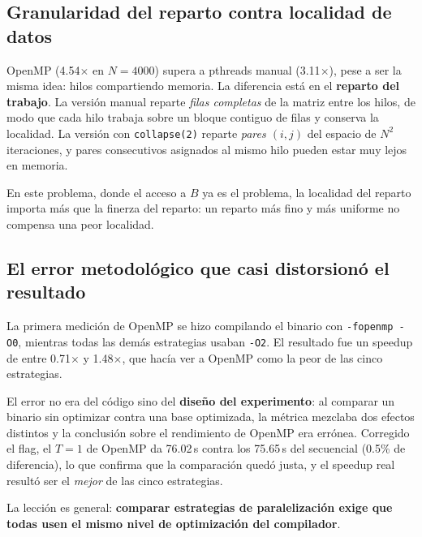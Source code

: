 \subsection{Granularidad del reparto contra localidad de datos}

OpenMP (4.54$\times$ en $N=4000$) supera a pthreads manual (3.11$\times$), pese a ser la misma idea: hilos compartiendo memoria. La diferencia está en el \textbf{reparto del trabajo}. La versión manual reparte \emph{filas completas} de la matriz entre los hilos, de modo que cada hilo trabaja sobre un bloque contiguo de filas y conserva la localidad. La versión con \texttt{collapse(2)} reparte \emph{pares $(i,j)$} del espacio de $N^2$ iteraciones, y pares consecutivos asignados al mismo hilo pueden estar muy lejos en memoria.

En este problema, donde el acceso a $B$ ya es el problema, la localidad del reparto importa más que la finerza del reparto: un reparto más fino y más uniforme no compensa una peor localidad.

\subsection{El error metodológico que casi distorsionó el resultado}

La primera medición de OpenMP se hizo compilando el binario con \texttt{-fopenmp -O0}, mientras todas las demás estrategias usaban \texttt{-O2}. El resultado fue un speedup de entre 0.71$\times$ y 1.48$\times$, que hacía ver a OpenMP como la peor de las cinco estrategias.

El error no era del código sino del \textbf{diseño del experimento}: al comparar un binario sin optimizar contra una base optimizada, la métrica mezclaba dos efectos distintos y la conclusión sobre el rendimiento de OpenMP era errónea. Corregido el flag, el $T=1$ de OpenMP da 76.02\,s contra los 75.65\,s del secuencial (0.5\% de diferencia), lo que confirma que la comparación quedó justa, y el speedup real resultó ser el \emph{mejor} de las cinco estrategias.

La lección es general: \textbf{comparar estrategias de paralelización exige que todas usen el mismo nivel de optimización del compilador}.
